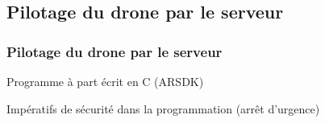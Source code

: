 \begin{frame}
\begin{center}
\begin{tabular}{cc}
\end{tabular}
\end{center}
\end{frame}

\subsection{Pilotage du drone par le serveur}
\begin{frame}
\frametitle{Pilotage du drone par le serveur}
\begin{center}
Programme à part écrit en C (ARSDK)

Impératifs de sécurité dans la programmation (arrêt d'urgence)
\end{center}
\end{frame}